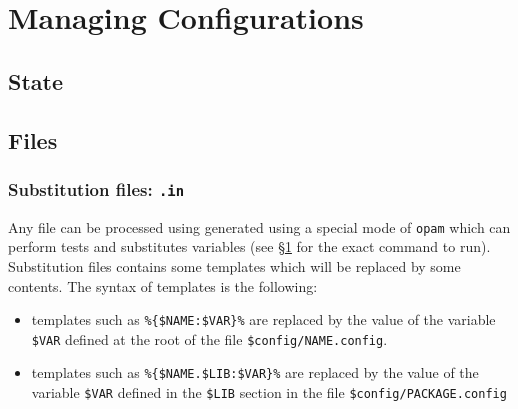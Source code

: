 \documentclass[a4paper,11pt]{article}
\begin{document}
\section{Managing Configurations}
\label{section:config}

\subsection{State}

\subsection{Files}

\subsubsection{Substitution files: {\tt *.in}}
\label{file:subst}

Any file can be processed using generated using a special mode of
{\tt opam} which can perform tests and substitutes variables (see
\S\ref{section:config} for the exact command to run). Substitution files
contains some templates which will be replaced by some contents. The
syntax of templates is the following:

\begin{itemize}

\item templates such as \verb+%{$NAME:$VAR}%+ are replaced by the value
  of the variable \verb+$VAR+ defined at the root of the file
  \verb+$config/NAME.config+.

\item templates such as \verb+%{$NAME.$LIB:$VAR}%+ are replaced by the
  value of the variable \verb+$VAR+ defined in the \verb+$LIB+ section
  in the file \verb+$config/PACKAGE.config+


\end{itemize}
\end{document}
